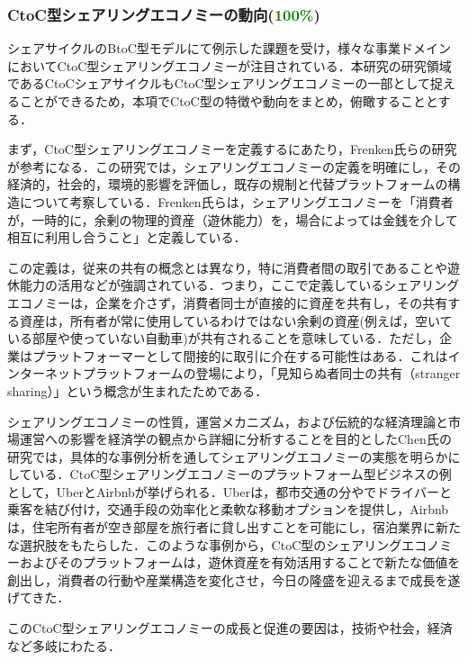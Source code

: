       \subsubsection{CtoC型シェアリングエコノミーの動向(\textcolor{green}{100\%})}
        \label{sec:CtoC型シェアリングエコノミーの動向}
          \par シェアサイクルのBtoC型モデルにて例示した課題を受け，様々な事業ドメインにおいてCtoC型シェアリングエコノミーが注目されている．本研究の研究領域であるCtoCシェアサイクルもCtoC型シェアリングエコノミーの一部として捉えることができるため，本項でCtoC型の特徴や動向をまとめ，俯瞰することとする．
          \par まず，CtoC型シェアリングエコノミーを定義するにあたり，Frenken氏らの研究 が参考になる．この研究では，シェアリングエコノミーの定義を明確にし，その経済的，社会的，環境的影響を評価し，既存の規制と代替プラットフォームの構造について考察している．Frenken氏らは，シェアリングエコノミーを「消費者が，一時的に，余剰の物理的資産（遊休能力）を，場合によっては金銭を介して相互に利用し合うこと」と定義している．
          \par この定義は，従来の共有の概念とは異なり，特に消費者間の取引であることや遊休能力の活用などが強調されている．つまり，ここで定義しているシェアリングエコノミーは，企業を介さず，消費者同士が直接的に資産を共有し，その共有する資産は，所有者が常に使用しているわけではない余剰の資産(例えば，空いている部屋や使っていない自動車)が共有されることを意味している．ただし，企業はプラットフォーマーとして間接的に取引に介在する可能性はある．これはインターネットプラットフォームの登場により，「見知らぬ者同士の共有（stranger sharing）」という概念が生まれたためである．
          \par シェアリングエコノミーの性質，運営メカニズム，および伝統的な経済理論と市場運営への影響を経済学の観点から詳細に分析することを目的としたChen氏の研究では，具体的な事例分析を通してシェアリングエコノミーの実態を明らかにしている．CtoC型シェアリングエコノミーのプラットフォーム型ビジネスの例として，UberとAirbnbが挙げられる．Uberは，都市交通の分やでドライバーと乗客を結び付け，交通手段の効率化と柔軟な移動オプションを提供し，Airbnbは，住宅所有者が空き部屋を旅行者に貸し出すことを可能にし，宿泊業界に新たな選択肢をもたらした．このような事例から，CtoC型のシェアリングエコノミーおよびそのプラットフォームは，遊休資産を有効活用することで新たな価値を創出し，消費者の行動や産業構造を変化させ，今日の隆盛を迎えるまで成長を遂げてきた．
          \par このCtoC型シェアリングエコノミーの成長と促進の要因は，技術や社会，経済など多岐にわたる．
